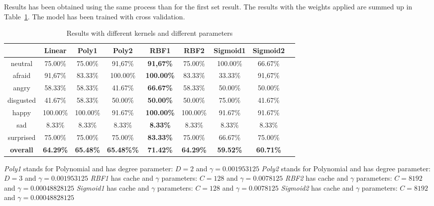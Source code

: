 \noindent Results has been obtained using the same process than for the first set result. The results with the weights applied are summed up in Table~\ref{table_results_kernels_weight}. The model has been trained with cross validation.
\newline

\begin{table}[h]
\begin{center}
   \caption{\label{table_results_kernels_weight} Results with different kernels and different parameters}
\begin{tabular}{|c|c|c|c|c|c|c|c|c|}
  \hline
    & Linear & \textbf{Poly1} & Poly2 & RBF1 & RBF2 & Sigmoid1 & Sigmoid2 \\
  \hline
  neutral & 75.00\% & 75.00\% & 91,67\% & \textbf{91,67\%} & 75.00\% & 100.00\% & 66.67\% \\
  afraid & 91,67\% & 83.33\% & 100.00\% & \textbf{100.00\%} & 83.33\% & 33.33\% & 91,67\% \\
  angry & 58.33\% & 58.33\% & 41.67\% & \textbf{66.67\%} & 58.33\% & 50.00\% & 50.00\% \\
  disgusted & 41.67\% & 58.33\% & 50.00\% & \textbf{50.00\%} & 50.00\% & 75.00\% & 41.67\% \\
  happy & 100.00\% & 100.00\% & 91.67\% & \textbf{100.00\%} & 100.00\% & 91.67\% & 91.67\% \\
  sad & 8.33\% & 8.33\% & 8.33\% & \textbf{8.33\%} & 8.33\% & 8.33\% & 8.33\% \\
  surprised & 75.00\% & 75.00\% & 75.00\% & \textbf{83.33\%} & 75.00\% & 66.67\% & 75.00\% \\
  \textbf{overall} & \textbf{64.29\%} & \textbf{65.48\%} & \textbf{{65.48\%}\%} & \textbf{{\color{red}71.42\%}} & \textbf{64.29\%} & \textbf{59.52\%} & \textbf{60.71\%} \\
  \hline
\end{tabular}
\end{center} 
\end{table}

\noindent \textit{Poly1} stands for Polynomial and has degree parameter: $ D = 2 $ and $ \gamma = 0.001953125 $
\newline
\noindent \textit{Poly2} stands for Polynomial and has degree parameter: $ D = 3 $ and $ \gamma = 0.001953125 $
\newline
\noindent \textit{RBF1} has cache and $\gamma$ parameters: $ C = 128 $ and $ \gamma = 0.0078125 $
\newline
\noindent \textit{RBF2} has cache and $\gamma$ parameters: $ C = 8192 $ and $ \gamma = 0.00048828125 $ 
\newline
\noindent \textit{Sigmoid1} has cache and $\gamma$ parameters: $ C = 128 $ and $ \gamma = 0.0078125 $
\newline
\noindent \textit{Sigmoid2} has cache and $\gamma$ parameters: $ C = 8192 $ and $ \gamma = 0.00048828125 $
\newline


